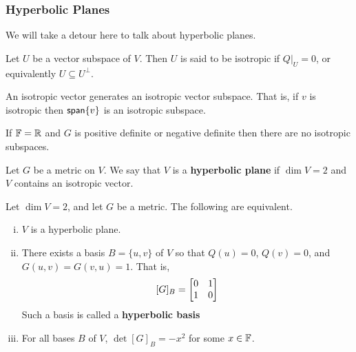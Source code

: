 \subsubsection{Hyperbolic Planes}
We will take a detour here to talk about hyperbolic planes.
\begin{defn}
    Let $U$ be a vector subspace of $V$. Then $U$ is said to be isotropic if $Q|_U=0$, or equivalently $U \subseteq U^\perp$.
\end{defn}
\begin{remark*}
    An isotropic vector generates an isotropic vector subspace. That is, if $v$ is isotropic then $\operatorname{\textsf{span}}\{v\}$ is an isotropic subspace.
\end{remark*}
If $\operatorname{\mathbb{F}} = \operatorname{\mathbb{R}}$ and $G$ is positive definite or negative definite then there are no isotropic subspaces.
\begin{defn}
    Let $G$ be a metric on $V$. We say that $V$ is a \textbf{hyperbolic plane} if $\dim V = 2$ and $V$ contains an isotropic vector.
\end{defn}
\begin{thm}
    Let $\dim V = 2$, and let $G$ be a metric. The following are equivalent.
    \begin{enumerate}[i)]
    \item {
    $V$ is a hyperbolic plane.
    }
    \item {
    There exists a basis $B=\{u,v\}$ of $V$ so that $Q(u)=0$, $Q(v)=0$, and $G(u,v)=G(v,u)=1$. That is,
    \[[G]_B = \begin{bmatrix}0&1\\1&0\end{bmatrix}\]
    Such a basis is called a \textbf{hyperbolic basis}
    }
    \item {
    For all bases $B$ of $V$, $\det [G]_B = -x^2$ for some $x \in \operatorname{\mathbb{F}}$.
    }
    \end{enumerate}
\end{thm}
